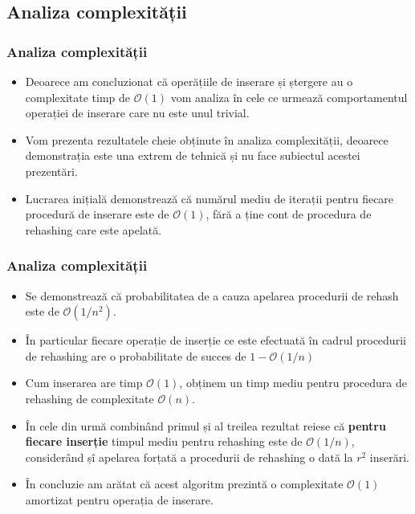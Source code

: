 \documentclass{beamer}
\begin{document}
\begin{frame}
\subsection{Analiza complexității}
\frametitle{Analiza complexității}
\begin{itemize}
\item Deoarece am concluzionat că operățiile de inserare și ștergere au o complexitate timp de $\mathcal{O}(1)$ vom analiza în cele ce urmează comportamentul operației de inserare care nu este unul trivial.

\item Vom prezenta rezultatele cheie obținute în analiza complexității, deoarece demonstrația este una extrem de tehnică și nu face subiectul acestei prezentări.

\item Lucrarea inițială demonstrează că numărul mediu de iterații pentru fiecare procedură de inserare este de $\mathcal{O}(1)$, fără a ține cont de procedura de rehashing care este apelată.

\end{itemize}
\end{frame}
\begin{frame}
\frametitle{Analiza complexității}
\begin{itemize}

\item Se demonstrează că probabilitatea de a cauza apelarea procedurii de rehash este de $\mathcal{O}(1/n^2).$

\item În particular fiecare operație de inserție ce este efectuată în cadrul procedurii de rehashing are o probabilitate de succes de $1 - \mathcal{O}(1/n)$

\item Cum inserarea are timp $\mathcal{O}(1)$, obținem un timp mediu pentru procedura de rehashing de complexitate $\mathcal{O}(n)$. 

\item În cele din urmă combinând primul și al treilea rezultat reiese că \textbf{pentru fiecare inserție} timpul mediu pentru rehashing este de $\mathcal{O}(1/n)$, considerând șî apelarea forțată a procedurii de rehashing o dată la $r^2$ inserări.

\item În concluzie am arătat că acest algoritm prezintă o complexitate $\mathcal{O}(1)$ amortizat pentru operația de inserare.
\end{itemize}
\end{frame}
\end{document}
